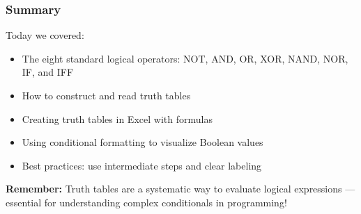 \documentclass{beamer}
\begin{document}
\begin{frame}
\frametitle{Summary}
Today we covered:\pause

\begin{itemize}
    \item The eight standard logical operators: NOT, AND, OR, XOR, NAND, NOR, IF, and IFF\pause
    \item How to construct and read truth tables\pause
    \item Creating truth tables in Excel with formulas\pause
    \item Using conditional formatting to visualize Boolean values\pause
    \item Best practices: use intermediate steps and clear labeling
\end{itemize}\pause

\vspace{0.3cm}
\textbf{Remember:} Truth tables are a systematic way to evaluate logical expressions --- essential for understanding complex conditionals in programming!
\end{frame}
\end{document}
